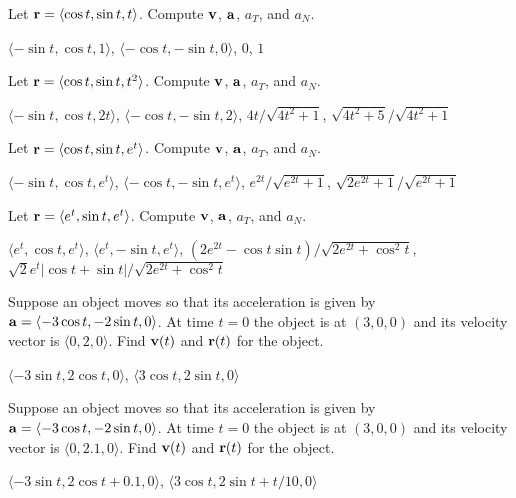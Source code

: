 \begin{exercises}

\exercise Let ${\bf r}=\langle \cos t,\sin t,t\rangle$. 
Compute ${\bf v}$, ${\bf a}$,
$a_T$, and $a_N$.
\begin{answer} $\langle -\sin t,\cos t,1\rangle$,
$\langle -\cos t, -\sin t,0\rangle$,
$0$, $1$
\end{answer}

\exercise Let ${\bf r}=\langle \cos t,\sin t,t^2\rangle$. 
Compute ${\bf v}$, ${\bf a}$,
$a_T$, and $a_N$.
\begin{answer} $\langle -\sin t,\cos t,2t\rangle$,
$\langle -\cos t, -\sin t,2\rangle$,
$4t/\sqrt{4t^2+1}$, $\sqrt{4t^2+5}/\sqrt{4t^2+1}$
\end{answer}

\exercise Let ${\bf r}=\langle \cos t,\sin t,e^t\rangle$. 
Compute ${\bf v}$, ${\bf a}$,
$a_T$, and $a_N$.
\begin{answer} $\langle -\sin t,\cos t,e^t\rangle$,
$\langle -\cos t, -\sin t,e^t\rangle$,
$e^{2t}/\sqrt{e^{2t}+1}$, $\sqrt{2e^{2t}+1}/\sqrt{e^{2t}+1}$
\end{answer}

\exercise Let ${\bf r}=\langle e^t,\sin t,e^t\rangle$. 
Compute ${\bf v}$, ${\bf a}$,
$a_T$, and $a_N$.
\begin{answer} $\langle e^t,\cos t,e^t\rangle$,
$\langle e^t, -\sin t,e^t\rangle$,
$(2e^{2t}-\cos t\sin t)/\sqrt{2e^{2t}+\cos^2 t}$, 
$\sqrt{2}e^t|\cos t+\sin t|/\sqrt{2e^{2t}+\cos^2 t}$
\end{answer}

\exercise Suppose an object moves so that its acceleration is given by
${\bf a}=\langle -3\cos t,-2\sin t,0\rangle$. At time $t=0$ the object
is at $(3,0,0)$ and its velocity vector is $\langle
0,2,0\rangle$. Find ${\bf v}(t)$ and ${\bf r}(t)$ for the object.
\begin{answer} $\langle -3\sin t,2\cos t,0\rangle$,
$\langle 3\cos t, 2\sin t,0\rangle$
\end{answer}

\exercise Suppose an object moves so that its acceleration is given by
${\bf a}=\langle -3\cos t,-2\sin t,0\rangle$. At time $t=0$ the object
is at $(3,0,0)$ and its velocity vector is $\langle
0,2.1,0\rangle$. Find ${\bf v}(t)$ and ${\bf r}(t)$ for the object.
\begin{answer} $\langle -3\sin t,2\cos t+0.1,0\rangle$,
$\langle 3\cos t, 2\sin t+t/10,0\rangle$
\end{answer}


\end{exercises}

